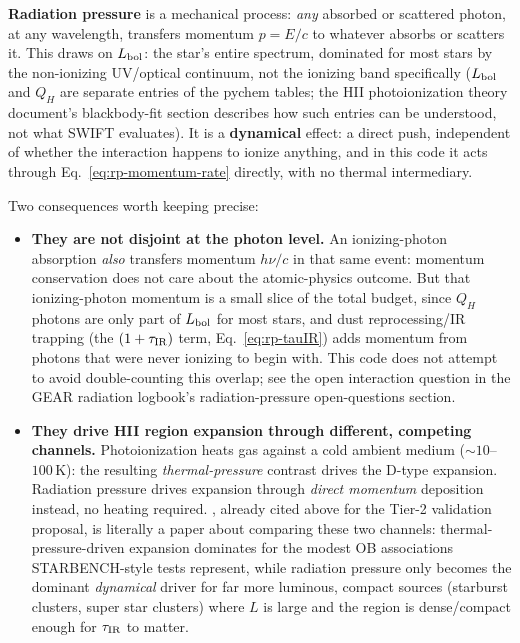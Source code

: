 \textbf{Radiation pressure} is a mechanical process: \emph{any}
absorbed or scattered photon, at any wavelength, transfers momentum
$p=E/c$ to whatever absorbs or scatters it. This draws on $L_{\rm
bol}$: the star's entire spectrum, dominated for most stars by the
non-ionizing UV/optical continuum, not the ionizing band specifically
($L_{\rm bol}$ and $Q_H$ are separate entries of the pychem tables;
the HII photoionization theory document's blackbody-fit section
describes how such entries can be understood, not what SWIFT evaluates). It is
a \textbf{dynamical} effect: a direct push, independent of whether
the interaction happens to ionize anything, and in this code it acts
through Eq.~\ref{eq:rp-momentum-rate} directly, with no thermal
intermediary.

Two consequences worth keeping precise:
\begin{itemize}
  \item \textbf{They are not disjoint at the photon level.} An
    ionizing-photon absorption \emph{also} transfers momentum
    $h\nu/c$ in that same event: momentum conservation does not care
    about the atomic-physics outcome. But that ionizing-photon
    momentum is a small slice of the total budget, since $Q_H$
    photons are only part of $L_{\rm bol}$ for most stars, and dust
    reprocessing/IR trapping (the $(1+\tau_{\rm IR})$ term,
    Eq.~\ref{eq:rp-tauIR}) adds momentum from photons that were never
    ionizing to begin with. This code does not attempt to avoid
    double-counting this overlap; see the open interaction question
    in the GEAR radiation logbook's radiation-pressure open-questions
    section.
  \item \textbf{They drive HII region expansion through different,
    competing channels.} Photoionization heats gas against a cold
    ambient medium ($\sim10$--$100\,$K): the resulting
    \emph{thermal-pressure} contrast drives the D-type expansion.
    Radiation pressure drives expansion through \emph{direct momentum}
    deposition instead, no heating required.
    \citet{KrumholzMatzner2009}, already cited above for the Tier-2
    validation proposal, is literally a paper about comparing these
    two channels: thermal-pressure-driven expansion dominates for the
    modest OB associations STARBENCH-style tests represent, while
    radiation pressure only becomes the dominant \emph{dynamical}
    driver for far more luminous, compact sources (starburst clusters,
    super star clusters) where $L$ is large and the region is
    dense/compact enough for $\tau_{\rm IR}$ to matter.
\end{itemize}


